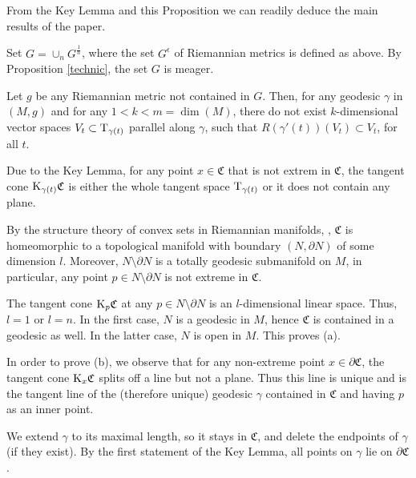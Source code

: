 \documentclass[a4paper,10pt]{article}
\begin{document}
  
  From the Key Lemma and this Proposition we can readily deduce the main results of the paper. 
  
 
   Set $G= \cup _n G^{\frac 1 n}$, where the set $G^{\epsilon}$ of Riemannian metrics 
   is defined as above.  By Proposition \ref{technic}, the set $G$ is meager.
   
   Let $g$ be any Riemannian metric not contained in $G$.   
   Then, for any 
   geodesic $\gamma$ in $(M,g)$ and for any $1< k< m =\dim (M)$,  there do not exist 
    $k$-dimensional vector spaces  $V_t \subset \mathrm{T} _{\gamma(t) } $   parallel  along $\gamma$,
    such that   $R(\gamma'(t))  (V_t)\subset V_t$,  for all $t$.
    
    Due to  the Key Lemma, for any point $x\in \mathfrak C$ that is not extrem in $\mathfrak C$, the tangent cone $\mathrm{K}_{\gamma (t)} \mathfrak C$ is either the whole tangent space $\mathrm{T}_{\gamma (t)}$ or it does not contain any plane. 
    
    
 
 
 By the structure theory of convex sets in Riemannian manifolds, \cite{}, $\mathfrak C$ is homeomorphic to a topological manifold with boundary $(N, \partial N)$ of some dimension 
 $l$.  Moreover, $N\setminus \partial N$ is a totally geodesic submanifold on $M$,
 in particular, any point $p\in N\setminus \partial N$  is not extreme in $\mathfrak C$.
 
 The tangent cone  $\mathrm{K}_{p} \mathfrak C$ at any   $p \in N\setminus \partial N$ is an  $l$-dimensional linear space. Thus,   $l=1$ or $l=n$. In the first case, $N$ is a geodesic in $M$, hence $\mathfrak C$ is contained in a geodesic as well.
 In the latter case,  $N$ is open in $M$.   This proves (a).
 
 
 In order to prove (b), we observe that for any non-extreme point $x\in \partial  \mathfrak C$,
 the tangent cone $\mathrm{K}_x \mathfrak C$ splits off a line but not a plane.  Thus this line is unique  and is the tangent line of the (therefore unique) geodesic $\gamma$ contained in $\mathfrak C$ and having $p$ as an inner point.  
 
 We extend $\gamma$ to its maximal length, so it stays in $\mathfrak C$, and delete the endpoints of $\gamma$  (if they exist).  By the first statement of the Key Lemma, all points on $\gamma$ lie on $\partial \mathfrak C$. 
 
\end{document}
